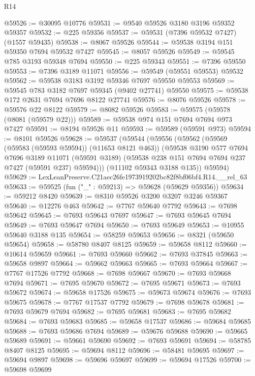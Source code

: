 \begin{lexlean}{R14}
\begin{coremodule}
@59526 := @30095 @10776
@59531 := @9540 @59526 @3180 @3196 @59352 @59357
@59532 := @225 @59356
@59537 := @59531 (@7396 @59532 @7427) (@1557 @59435)
@59538 := @8067 @59526
@59544 := @59538 @3194 @151 @59350 @7694 @59532 @7427
@59545 := @8057 @59526
@59549 := @59545 @785 @3193 @59348 @7694
@59550 := @225 @59343
@59551 := @7396 @59550
@59553 := @7396 @3189 @11071
@59556 := @59549 (@59551 @59553) @59532
@59562 := @59538 @3183 @3192 @59346 @7697 @59550 @59553
@59569 := @59545 @783 @3182 @7697 @59345 (@9402 @27741) @59550
@59575 := @59538 @172 @2631 @7694 @7696 @8122 @27741
@59576 := @8076 @59526
@59578 := @59576 @22 @8122
@59579 := @8082 @59526
@59583 := @59575 (@59578 (@8081 (@59579 @22)))
@59589 := @59538 @974 @151 @7694 @7694 @973 @7427
@59591 := @8194 @59526 @11
@59593 := @59589 (@59591 @973)
@59594 := @8101 @59526
@59628 := @59537
    (@59544
      (@59556
        (@59562
          (@59569 (@59583 (@59593 @59594)) (@11653 @8121 @463))
          (@59538
            @3190
            @577
            @7694
            @7696
            @3189
            @11071
            (@59591 @3189)
            (@59538 @238 @151 @7694 @7694 @237 @7427 (@59591 @237) @59594)))
        (@11102 @59343 @3188 @135))
      @59594)
@59629 := LexLeanPreserve.C21aec26fe1973919202bc82f8bf06bf4.R14.__rel_63
@59633 := @59525 (fun ("_" : @59213) => @59628 (@59629 @59356))
@59634 := @59212 @8420
@59639 := @8310 @59526 @3200 @3207 @3246 @59367
@59640 := @12276 @463
@59642 := @7767 @59640 @7792
@59643 := @7698 @59642
@59645 := @7693 @59643 @7697
@59647 := @7693 @59645 @7694
@59649 := @7693 @59647 @7694
@59650 := @7693 @59649
@59653 := @10955 @59640 @3188 @135
@59654 := @58259 @59653
@59656 := @8321 (@59650 @59654)
@59658 := @58780 @8407 @8125
@59659 := @59658 @8112
@59660 := @10614 @59659
@59661 := @7693 @59660
@59662 := @7693 @37845
@59663 := @59658 @9897
@59664 := @59662 @59663
@59665 := @7693 @59664
@59667 := @7767 @17526 @7792
@59668 := @7698 @59667
@59670 := @7693 @59668 @7694
@59671 := @7695 @59670
@59672 := @7695 @59671
@59673 := @7693 @59672
@59674 := @59658 @17526
@59675 := @59673 @59674
@59676 := @7693 @59675
@59678 := @7767 @17537 @7792
@59679 := @7698 @59678
@59681 := @7693 @59679 @7694
@59682 := @7695 @59681
@59683 := @7695 @59682
@59684 := @7693 @59683
@59685 := @59658 @17537
@59686 := @59684 @59685
@59688 := @7693 @59686 @7694
@59689 := @59676 @59688
@59690 := @59665 @59689
@59691 := @59661 @59690
@59692 := @7693 @59691
@59694 := @58785 @8407 @8125
@59695 := @59694 @8112
@59696 := @58481 @59695
@59697 := @59694 @9897
@59698 := @59696 @59697
@59699 := @59694 @17526
@59700 := @59698 @59699

\end{coremodule}
\end{lexlean}
